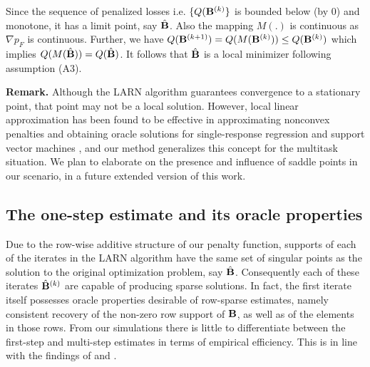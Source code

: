 \noindent Since the sequence of penalized losses i.e. $\{ Q({\mathbf{B}}^{(k)} \}$ is bounded below (by 0) and monotone, it has a limit point, say $\hat{{\mathbf{B}}}$. Also the mapping $M(.)$ is continuous as $\nabla p_F$ is continuous. Further, we have $Q({\mathbf{B}}^{(k+1)}) = Q(M({\mathbf{B}}^{(k)})) \leq Q({\mathbf{B}}^{(k)})$ which implies $Q(M(\hat{{\mathbf{B}}})) = Q(\hat{{\mathbf{B}}})$. It follows that $\hat{{\mathbf{B}}}$ is a local minimizer following assumption (A3).

\vspace{1em}
\textbf{Remark.} Although the LARN algorithm guarantees convergence to a stationary point, that point may not be a local solution. However, local linear approximation has been found to be effective in approximating nonconvex penalties and obtaining oracle solutions for single-response regression \citep{ZouLi08} and support vector machines \citep{PengThesis}, and our method generalizes this concept for the multitask situation. We plan to elaborate on the presence and influence of saddle points in our scenario, in a future extended version of this work.

\subsection{The one-step estimate and its oracle properties}

Due to the row-wise additive structure of our penalty function, supports of each of the iterates in the LARN algorithm have the same set of singular points as the solution to the original optimization problem, say $\hat{{\mathbf{B}}}$. Consequently each of these iterates $\hat{{\mathbf{B}}}^{(k)}$ are capable of producing sparse solutions. In fact, the first iterate itself possesses oracle properties desirable of row-sparse estimates, namely consistent recovery of the non-zero row support of ${\mathbf{B}}$, as well as of the elements in those rows. From our simulations there is little to differentiate between the first-step and multi-step estimates in terms of empirical efficiency. This is in line with the findings of \cite{ZouLi08} and \cite{FanChen99}.

